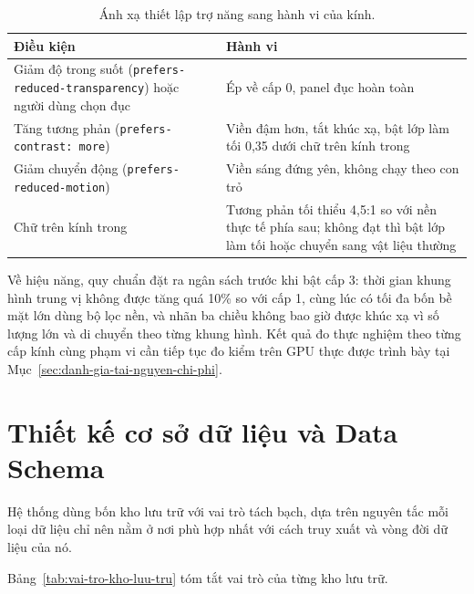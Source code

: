 \begin{table}[htbp]
    \centering
    \caption{Ánh xạ thiết lập trợ năng sang hành vi của kính.}
    \label{tab:tro-nang-kinh}
    \small
    \begin{tabularx}{\textwidth}{@{}>{\raggedright\arraybackslash}p{5.2cm}>{\raggedright\arraybackslash}X@{}}
        \toprule
        \textbf{Điều kiện} & \textbf{Hành vi} \\
        \midrule
        Giảm độ trong suốt (\texttt{prefers-reduced-\allowbreak transparency}) hoặc người dùng chọn đục & Ép về cấp 0, panel đục hoàn toàn \\
        Tăng tương phản (\texttt{prefers-contrast: more}) & Viền đậm hơn, tắt khúc xạ, bật lớp làm tối 0,35 dưới chữ trên kính trong \\
        Giảm chuyển động (\texttt{prefers-reduced-\allowbreak motion}) & Viền sáng đứng yên, không chạy theo con trỏ \\
        Chữ trên kính trong & Tương phản tối thiểu 4,5:1 so với nền thực tế phía sau; không đạt thì bật lớp làm tối hoặc chuyển sang vật liệu thường \\
        \bottomrule
    \end{tabularx}
\end{table}

Về hiệu năng, quy chuẩn đặt ra ngân sách trước khi bật cấp 3: thời gian khung hình trung vị không được tăng quá 10\% so với cấp 1, cùng lúc có tối đa bốn bề mặt lớn dùng bộ lọc nền, và nhãn ba chiều không bao giờ được khúc xạ vì số lượng lớn và di chuyển theo từng khung hình. Kết quả đo thực nghiệm theo từng cấp kính cùng phạm vi cần tiếp tục đo kiểm trên GPU thực được trình bày tại Mục~\ref{sec:danh-gia-tai-nguyen-chi-phi}.

\section{Thiết kế cơ sở dữ liệu và Data Schema}
\label{sec:thiet-ke-csdl}

Hệ thống dùng bốn kho lưu trữ với vai trò tách bạch, dựa trên nguyên tắc mỗi loại dữ liệu chỉ nên nằm ở nơi phù hợp nhất với cách truy xuất và vòng đời dữ liệu của nó.

Bảng~\ref{tab:vai-tro-kho-luu-tru} tóm tắt vai trò của từng kho lưu trữ.

